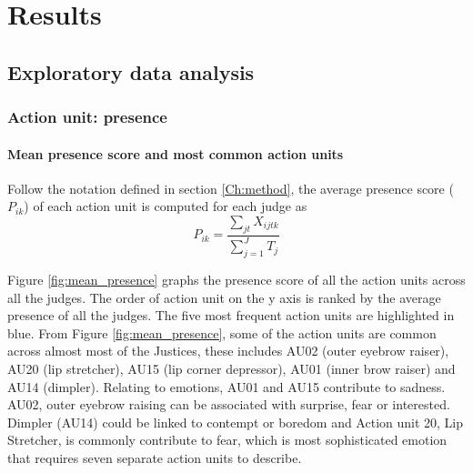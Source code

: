 \documentclass{monashthesis}
\begin{document}
\let\cleardoublepage\clearpage

\hypertarget{results}{%
\chapter{Results}\label{results}}

\hypertarget{exploratory-data-analysis}{%
\section{Exploratory data analysis}\label{exploratory-data-analysis}}

\hypertarget{action-unit-presence}{%
\subsection{Action unit: presence}\label{action-unit-presence}}

\hypertarget{mean-presence-score-and-most-common-action-units}{%
\subsubsection{Mean presence score and most common action units}\label{mean-presence-score-and-most-common-action-units}}

Follow the notation defined in section \ref{Ch:method}, the average presence score (\(P_{ik}\)) of each action unit is computed for each judge as \[P_{ik} = \frac{\sum_{jt}X_{ijtk}}{\sum_{j = 1}^JT_j}\]

\noindent Figure \ref{fig:mean_presence} graphs the presence score of all the action units across all the judges. The order of action unit on the y axis is ranked by the average presence of all the judges. The five most frequent action units are highlighted in blue. From Figure \ref{fig:mean_presence}, some of the action units are common across almost most of the Justices, these includes AU02 (outer eyebrow raiser), AU20 (lip stretcher), AU15 (lip corner depressor), AU01 (inner brow raiser) and AU14 (dimpler). Relating to emotions, AU01 and AU15 contribute to sadness. AU02, outer eyebrow raising can be associated with surprise, fear or interested. Dimpler (AU14) could be linked to contempt or boredom and Action unit 20, Lip Stretcher, is commonly contribute to fear, which is most sophisticated emotion that requires seven separate action units to describe.
\end{document}
